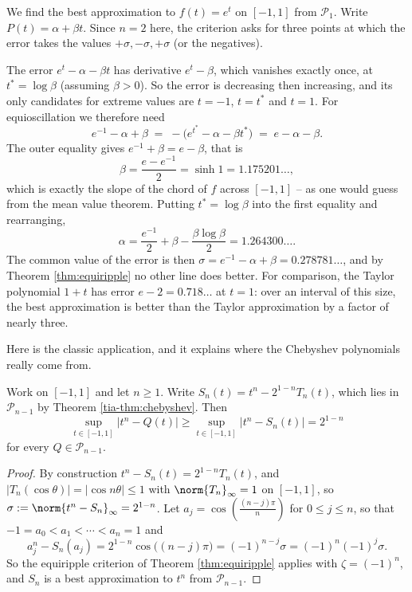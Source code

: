 \documentclass[a4paper]{scrartcl}
\newcommand{\Pn}{\mathcal{P}}
\begin{document}
\begin{example}
	We find the best approximation to $f(t) = e^t$ on $[-1,1]$ from $\Pn_1$. Write $P(t) = \alpha+\beta t$. Since $n = 2$ here, the criterion asks for three points at which the error takes the values $+\sigma,-\sigma,+\sigma$ (or the negatives).

	The error $e^t - \alpha-\beta t$ has derivative $e^t - \beta$, which vanishes exactly once, at $t^* = \log\beta$ (assuming $\beta>0$). So the error is decreasing then increasing, and its only candidates for extreme values are $t = -1$, $t = t^*$ and $t=1$. For equioscillation we therefore need
	$$e^{-1}-\alpha+\beta \;=\; -\big(e^{t^*}-\alpha-\beta t^*\big) \;=\; e - \alpha-\beta.$$
	The outer equality gives $e^{-1}+\beta = e - \beta$, that is
	$$\beta = \frac{e-e^{-1}}{2} = \sinh 1 = 1.175201\ldots,$$
	which is exactly the slope of the chord of $f$ across $[-1,1]$ -- as one would guess from the mean value theorem. Putting $t^*=\log\beta$ into the first equality and rearranging,
	$$\alpha = \frac{e^{-1}}{2}+\beta-\frac{\beta\log\beta}{2} = 1.264300\ldots.$$
	The common value of the error is then $\sigma = e^{-1}-\alpha+\beta = 0.278781\ldots$, and by Theorem \ref{thm:equiripple} no other line does better. For comparison, the Taylor polynomial $1+t$ has error $e-2 = 0.718\ldots$ at $t=1$: over an interval of this size, the best approximation is better than the Taylor approximation by a factor of nearly three.
\end{example}

Here is the classic application, and it explains where the Chebyshev polynomials really come from.

\begin{theorem}\label{thm:best-approx-tn}
	Work on $[-1,1]$ and let $n\geq1$. Write $S_n(t) = t^n - 2^{1-n}T_n(t)$, which lies in $\Pn_{n-1}$ by Theorem \ref{tia-thm:chebyshev}. Then
	$$\sup_{t\in[-1,1]}|t^n - Q(t)| \geq \sup_{t\in[-1,1]}|t^n-S_n(t)| = 2^{1-n}$$
	for every $Q\in\Pn_{n-1}$.
\end{theorem}

\begin{proof}
	By construction $t^n - S_n(t) = 2^{1-n}T_n(t)$, and $|T_n(\cos\theta)| = |\cos n\theta|\leq1$ with $\norm{T_n}_\infty=1$ on $[-1,1]$, so $\sigma := \norm{t^n - S_n}_\infty = 2^{1-n}$. Let $a_j = \cos\left(\frac{(n-j)\pi}{n}\right)$ for $0\leq j \leq n$, so that $-1 = a_0<a_1<\cdots<a_n = 1$ and
	$$a_j^n - S_n(a_j) = 2^{1-n}\cos\big((n-j)\pi\big) = (-1)^{n-j}\sigma = (-1)^n(-1)^j\sigma.$$
	So the equiripple criterion of Theorem \ref{thm:equiripple} applies with $\zeta = (-1)^n$, and $S_n$ is a best approximation to $t^n$ from $\Pn_{n-1}$.
\end{proof}
\end{document}
